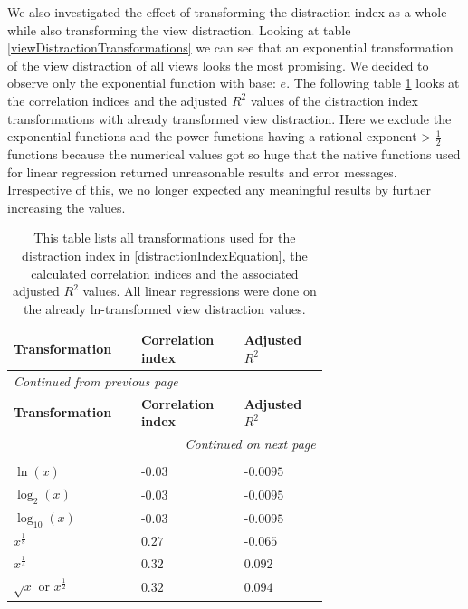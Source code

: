 We also investigated the effect of transforming the distraction index as a whole while also transforming the view distraction.
Looking at table \ref{viewDistractionTransformations} we can see that an exponential transformation of the view distraction of all views
looks the most promising. We decided to observe only the exponential function with base: $e$.
The following table \ref{distractionIndexTransformationsWithTransformedViewDistraction} looks at the correlation indices and the adjusted $R^2$
values of the distraction index transformations with already transformed view distraction. Here we exclude the exponential functions and the power
functions having a rational exponent > $\frac{1}{2}$ functions because the numerical values got so huge that the native functions used for linear
regression returned unreasonable results and error messages. Irrespective of this, we no longer expected any meaningful results by further increasing
the values.

\begin{longtable}{| p{0.24\linewidth} | p{0.25\linewidth} | p{0.20\linewidth}|}
    \hline
    \textbf{Transformation} & \textbf{Correlation index} & \textbf{Adjusted $R^2$} \\
    \hline
    \endfirsthead
    \multicolumn{3}{l}{{\textit{Continued from previous page}}} \\
    \hline
    \textbf{Transformation} & \textbf{Correlation index} & \textbf{Adjusted $R^2$} \\
    \hline
    \endhead
    \hline \multicolumn{3}{r}{{\textit{Continued on next page}}} \\
    \endfoot
    \hline
    \caption{This table lists all transformations used for the distraction index in \ref{distractionIndexEquation}, the calculated correlation indices and the associated adjusted $R^2$ values. All linear regressions were done on the already ln-transformed view distraction values. \label{distractionIndexTransformationsWithTransformedViewDistraction}}\\
    \endlastfoot
    $ \ln(x) $ & -$0.03$ & -$0.0095$ \\
    \hline
    $ \log_{2}(x) $ & -$0.03$ & -$0.0095$ \\
    \hline
    $ \log_{10}(x) $ & -$0.03$ & -$0.0095$ \\
    \hline
    $ x^{\frac{1}{8}} $ & $0.27$ & -$0.065$ \\
    \hline
    $ x^{\frac{1}{4}} $ & $0.32$ & $0.092$ \\
    \hline
    $ \sqrt{x} $ or $ x^{\frac{1}{2}} $ & $0.32$ & $0.094$ \\
\end{longtable}

